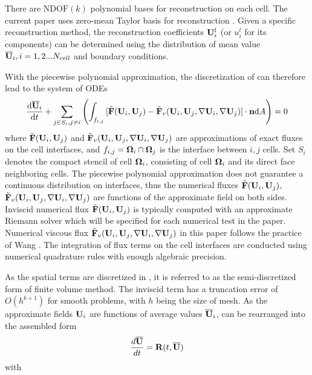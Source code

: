 There are $\mathrm{NDOF}(k)$ polynomial bases for reconstruction on
each cell.
The current paper uses zero-mean Taylor basis
for reconstruction \cite{wang2017compact_VR}.
Given a specific reconstruction method,
the reconstruction coefficients $\mathbf{U}_i^l$ (or $u_i^l$ for
its components) can be determined using
the distribution of mean value $\overline{\mathbf{U}}_i, i=1,2...N_{cell}$
and boundary conditions.

With the piecewise polynomial approximation,
the discretization of  can therefore lead 
to the system of ODEs
\begin{equation}
    \label{eq:FVInt}
    \frac{\dd\overline{\mathbf{U}}_i}{\dd t}
    +\sum_{j\in S_i, j\neq i}{\left(
        \int_{f_{i,j}}{
            [\tilde{\mathbf{F}}(\mathbf{U}_i,\mathbf{U}_j) - \tilde{\mathbf{F}}_v(\mathbf{U}_i,\mathbf{U}_j, \nabla \mathbf{U}_i, \nabla \mathbf{U}_j)] \cdot \mathbf{n}  \dd A
        }\right)
    }
    = 0
\end{equation}
where $\tilde{\mathbf{F}}(\mathbf{U}_i,\mathbf{U}_j)$ and $\tilde{\mathbf{F}}_v(\mathbf{U}_i,\mathbf{U}_j, \nabla \mathbf{U}_i, \nabla \mathbf{U}_j)$ are approximations
of exact fluxes on the cell interfaces,
and $f_{i,j}=\mathbf{\Omega}_i \cap \mathbf{\Omega}_j$ is the interface between $i,j$ cells.
Set $S_i$ denotes the compact stencil of cell $\mathbf{\Omega}_{i}$, consisting
of cell $\mathbf{\Omega}_{i}$ and its direct face neighboring cells.
The piecewise polynomial approximation  does not
guarantee a continuous distribution on interfaces,
thus the numerical fluxes
$\tilde{\mathbf{F}}(\mathbf{U}_i,\mathbf{U}_j)$, $\tilde{\mathbf{F}}_v(\mathbf{U}_i,\mathbf{U}_j, \nabla \mathbf{U}_i, \nabla \mathbf{U}_j)$ are
functions of the approximate field on both sides. Inviscid numerical
flux $\tilde{\mathbf{F}}(\mathbf{U}_i,\mathbf{U}_j)$ is typically computed with an approximate Riemann solver which
will be specified for each numerical test in the paper.
Numerical viscous flux $\tilde{\mathbf{F}}_v(\mathbf{U}_i,\mathbf{U}_j, \nabla \mathbf{U}_i, \nabla \mathbf{U}_j)$
in this paper follows the practice of Wang \cite{wang2017compact_VR}.
The integration of flux terms on the cell interfaces
are conducted using numerical quadrature rules with
enough algebraic precision.

As the spatial terms are discretized in ,
it is referred to as the semi-discretized form of finite volume method.
The inviscid term has a truncation error of $O(h^{k+1})$ for smooth problems,
with $h$ being the size of mesh. As the approximate fields $\mathbf{U}_i$ are functions
of average values $\overline{\mathbf{U}}_i$,  can be rearranged into the
assembled form
\begin{equation}
    \label{eq:FVODE}
    \frac{d\overline{\mathbf{U}}}{dt} = \mathbf{R}(t, \overline{\mathbf{U}})
\end{equation}
with

